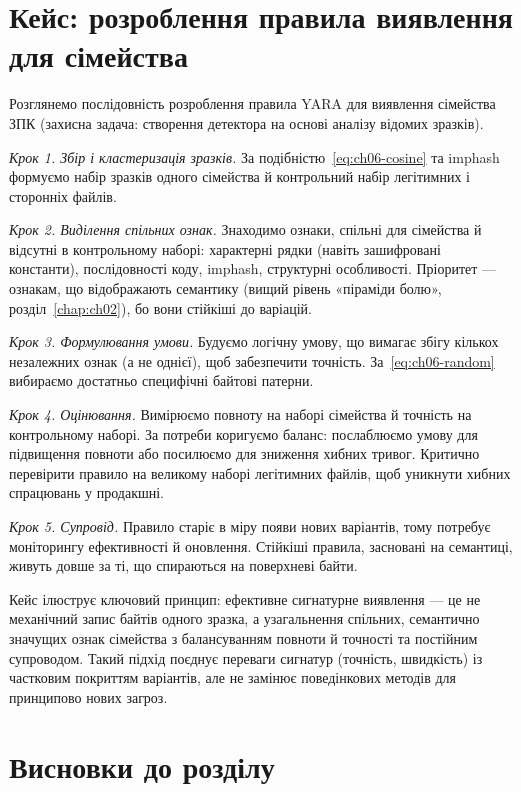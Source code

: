 \section{Кейс: розроблення правила виявлення для сімейства}\label{sec:ch06-case}

Розглянемо послідовність розроблення правила YARA для виявлення сімейства ЗПК (захисна задача: створення детектора на основі аналізу відомих зразків).

\emph{Крок 1. Збір і кластеризація зразків.} За подібністю~\eqref{eq:ch06-cosine} та imphash формуємо набір зразків одного сімейства й контрольний набір легітимних і сторонніх файлів.

\emph{Крок 2. Виділення спільних ознак.} Знаходимо ознаки, спільні для сімейства й відсутні в контрольному наборі: характерні рядки (навіть зашифровані константи), послідовності коду, imphash, структурні особливості. Пріоритет --- ознакам, що відображають семантику (вищий рівень «піраміди болю», розділ~\ref{chap:ch02}), бо вони стійкіші до варіацій.

\emph{Крок 3. Формулювання умови.} Будуємо логічну умову, що вимагає збігу кількох незалежних ознак (а не однієї), щоб забезпечити точність. За~\eqref{eq:ch06-random} вибираємо достатньо специфічні байтові патерни.

\emph{Крок 4. Оцінювання.} Вимірюємо повноту на наборі сімейства й точність на контрольному наборі. За потреби коригуємо баланс: послаблюємо умову для підвищення повноти або посилюємо для зниження хибних тривог. Критично перевірити правило на великому наборі легітимних файлів, щоб уникнути хибних спрацювань у продакшні.

\emph{Крок 5. Супровід.} Правило старіє в міру появи нових варіантів, тому потребує моніторингу ефективності й оновлення. Стійкіші правила, засновані на семантиці, живуть довше за ті, що спираються на поверхневі байти.

Кейс ілюструє ключовий принцип: ефективне сигнатурне виявлення --- це не механічний запис байтів одного зразка, а узагальнення спільних, семантично значущих ознак сімейства з балансуванням повноти й точності та постійним супроводом. Такий підхід поєднує переваги сигнатур (точність, швидкість) із частковим покриттям варіантів, але не замінює поведінкових методів для принципово нових загроз.

\section*{Висновки до розділу}

